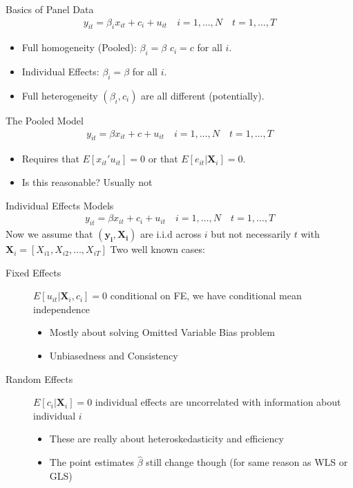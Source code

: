 \documentclass[aspectratio=169]{beamer}
\begin{document}
\begin{frame}{Basics of Panel Data}
\begin{align*}
y_{it} = \beta_i x_{it} + c_i + u_{it} \quad i=1,\ldots,N \quad t=1,\ldots,T
\end{align*}
\begin{itemize}
\item Full homogeneity (\alert{Pooled}): $\beta_i = \beta$ $c_i = c$ for all $i$. 
\item \alert{Individual Effects}: $\beta_i = \beta$ for all $i$.
\item \alert{Full heterogeneity} $(\beta_i,c_i)$ are all different (potentially).
\end{itemize}
\end{frame}


\begin{frame}{The Pooled Model}
\begin{align*}
y_{it} = \beta x_{it} + c + u_{it} \quad i=1,\ldots,N \quad t=1,\ldots,T
\end{align*}
\begin{itemize}
\item Requires that $E[x_{it}' u_{it}]=0$ or that $E[ e_{it} | \mathbf{X}_i]=0$.
\item Is this reasonable? Usually not
\end{itemize}
\end{frame}

\begin{frame}{Individual Effects Models}
\begin{align*}
y_{it} = \beta x_{it} + c_i + u_{it} \quad i=1,\ldots,N \quad t=1,\ldots,T
\end{align*}
Now we assume that $(\mathbf{y_i},\mathbf{X_i})$ are i.i.d across $i$ but not necessarily $t$ with $\mathbf{X}_i=[X_{i1},X_{i2},\ldots,X_{iT}]$
Two well known cases:
\begin{description}
    \item[Fixed Effects] $E[u_{it}| \mathbf{X}_i , c_i] = 0$ conditional on FE, we have \alert{conditional mean independence}
    \begin{itemize}
        \item Mostly about solving \alert{Omitted Variable Bias} problem
        \item \alert{Unbiasedness} and \alert{Consistency}
    \end{itemize}
    \item[Random Effects] $E[c_i | \mathbf{X}_i] = 0$ individual effects are uncorrelated with information about individual $i$
    \begin{itemize}
        \item These are really about \alert{heteroskedasticity} and \alert{efficiency}
        \item The point estimates $\widehat{\beta}$ still change though (for same reason as WLS or GLS)
    \end{itemize}
\end{description}
\end{frame}
\end{document}
